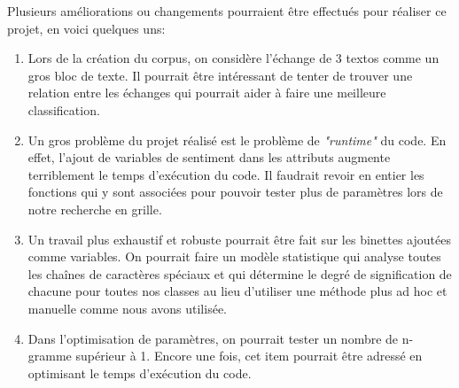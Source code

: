 Plusieurs améliorations ou changements pourraient être effectués pour réaliser ce projet, en voici quelques uns:

\begin{enumerate}
\item Lors de la création du corpus, on considère l'échange de 3 textos comme un gros bloc de texte. Il pourrait être intéressant de tenter de trouver une relation entre les échanges qui pourrait aider à faire une meilleure classification.

\item Un gros problème du projet réalisé est le problème de \emph{"runtime"} du code. En effet, l'ajout de variables de sentiment dans les attributs augmente terriblement le temps d'exécution du code. Il faudrait revoir en entier les fonctions qui y sont associées pour pouvoir tester plus de paramètres lors de notre recherche en grille.

\item Un travail plus exhaustif et robuste pourrait être fait sur les binettes ajoutées comme variables. On pourrait faire un modèle statistique qui analyse toutes les chaînes de caractères spéciaux et qui détermine le degré de signification de chacune pour toutes nos classes au lieu d'utiliser une méthode plus ad hoc et manuelle comme nous avons utilisée.

\item Dans l'optimisation de paramètres, on pourrait tester un nombre de n-gramme supérieur à 1. Encore une fois, cet item pourrait être adressé en optimisant le temps d'exécution du code.
\end{enumerate}